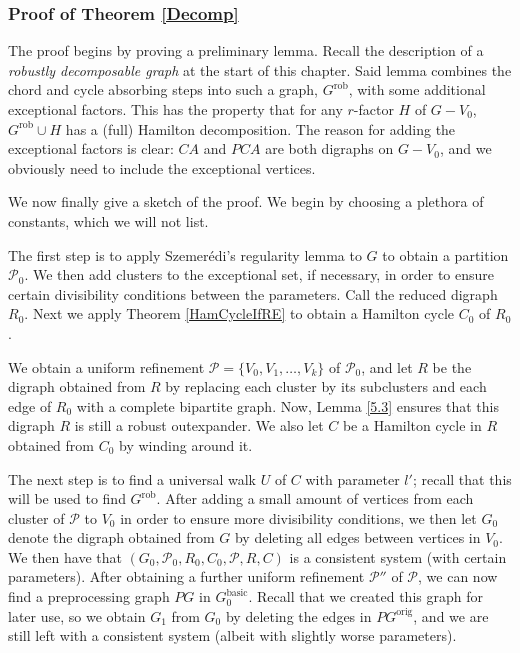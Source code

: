 \documentclass[10pt,letterpaper, reqno]{amsart}
\theoremstyle{definition}
\numberwithin{equation}{section}
\begin{document}
\subsubsection{Proof of Theorem \ref{Decomp}} The proof begins by proving a preliminary lemma. Recall the description of a \textit{robustly decomposable graph} at the start of this chapter. Said lemma combines the chord and cycle absorbing steps into such a graph, $G^\text{rob}$, with some additional exceptional factors. This has the property that for any $r$-factor $H$ of $G-V_0$, $G^\text{rob} \cup H$ has a (full) Hamilton decomposition. The reason for adding the exceptional factors is clear: $CA$ and $PCA$ are both digraphs on $G-V_0$, and we obviously need to include the exceptional vertices. 

We now finally give a sketch of the proof. We begin by choosing a plethora of constants, which we will not list.

The first step is to apply Szemer\'{e}di's regularity lemma to $G$ to obtain a partition $\mathcal{P}_0$. We then add clusters to the exceptional set, if necessary, in order to ensure certain divisibility conditions between the parameters. Call the reduced digraph $R_0$. Next we apply Theorem \ref{HamCycleIfRE} to obtain a Hamilton cycle $C_0$ of $R_0$. 

We obtain a uniform refinement $\mathcal{P}=\{V_0,V_1,\dots, V_k\}$ of $\mathcal{P}_0$, and let $R$ be the digraph obtained from $R$ by replacing each cluster by its subclusters and each edge of $R_0$ with a complete bipartite graph. Now, Lemma \ref{5.3} ensures that this digraph $R$ is still a robust outexpander. We also let $C$ be a Hamilton cycle in $R$ obtained from $C_0$ by winding around it.

The next step is to find a universal walk $U$ of $C$ with parameter $l'$; recall that this will be used to find $G^\text{rob}$. After adding a small amount of vertices from each cluster of $\mathcal{P}$ to $V_0$ in order to ensure more divisibility conditions, we then let $G_0$ denote the digraph obtained from $G$ by deleting all edges between vertices in $V_0$. We then have that $(G_0, \mathcal{P}_0, R_0,C_0,\mathcal{P},R,C)$ is a consistent system (with certain parameters). After obtaining a further uniform refinement $\mathcal{P}''$ of $\mathcal{P}$, we can now find a preprocessing graph $PG$ in $G_0^\text{basic}$. Recall that we created this graph for later use, so we obtain $G_1$ from $G_0$ by deleting the edges in $PG^\text{orig}$, and we are still left with a consistent system (albeit with slightly worse parameters). 
\end{document}
